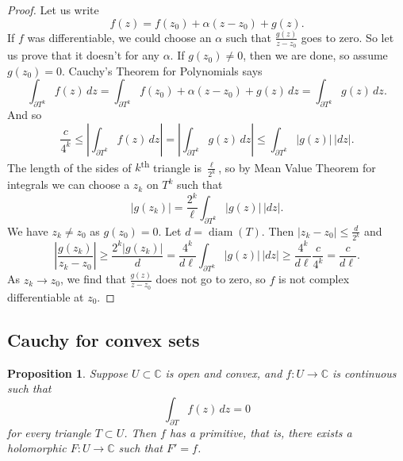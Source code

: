 \documentclass[12pt,openany]{book}
\newcommand{\sabs}[1]{\lvert {#1} \rvert}
\newcommand{\abs}[1]{\left\lvert {#1} \right\rvert}
\newcommand{\C}{{\mathbb{C}}}
\theoremstyle{plain}
\newtheorem{prop}[thm]{Proposition}
\theoremstyle{remark}
\theoremstyle{definition}
\theoremstyle{exercise}
\theoremstyle{example}
\begin{document}
\begin{proof}
Let us write
\begin{equation*}
f(z) = f(z_0) + \alpha (z-z_0) + g(z) .
\end{equation*}
If $f$ was differentiable, we could choose an $\alpha$ such that
$\frac{g(z)}{z-z_0}$ goes to zero.
So let us prove that it doesn't for any $\alpha$.  If $g(z_0) \not= 0$,
then we are done, so assume $g(z_0) = 0$.
Cauchy's Theorem for Polynomials says
\begin{equation*}
\int_{\partial T^k} f(z) \, dz =
\int_{\partial T^k} f(z_0) + \alpha (z-z_0) + g(z) \, dz =
\int_{\partial T^k} g(z) \, dz .
\end{equation*}
And so
\begin{equation*}
\frac{c}{4^k} \leq
\abs{
\int_{\partial T^k} f(z) \, dz
} =
\abs{
\int_{\partial T^k} g(z) \, dz 
}
\leq
\int_{\partial T^k} \sabs{g(z)} \, \sabs{dz} .
\end{equation*}
The length of the sides of $k$\textsuperscript{th} triangle is
$\frac{\ell}{2^k}$, so
by Mean Value Theorem for integrals we can choose a $z_k$ on $T^k$ such that
\begin{equation*}
\sabs{g(z_k)} = 
\frac{2^k}{\ell}
\int_{\partial T^k} \sabs{g(z)} \, \sabs{dz} .
\end{equation*}
We have $z_k \not= z_0$ as $g(z_0)=0$.
Let $d = \operatorname{diam}(T)$.  Then
$\sabs{z_k-z_0} \leq \frac{d}{2^k}$ and
\begin{equation*}
\abs{\frac{g(z_k)}{z_k-z_0}}
\geq
\frac{2^k\sabs{g(z_k)}}{d}
=
\frac{4^k}{d \ell}
\int_{\partial T^k} \sabs{g(z)} \, \sabs{dz}
\geq
\frac{4^k}{d \ell}
\frac{c}{4^k} = \frac{c}{d \ell} .
\end{equation*}
As $z_k \to z_0$, we find that $\frac{g(z)}{z-z_0}$ does not 
go to zero, so $f$ is not complex differentiable at $z_0$.
\end{proof}

\subsection{Cauchy for convex sets}

\begin{prop} \label{prop:primitiveinconvex1}
Suppose $U \subset \C$ is open and convex,
and $f \colon U \to \C$ is continuous such that
\begin{equation*}
\int_{\partial T} f(z) \, dz = 0
\end{equation*}
for every triangle $T \subset U$.
Then $f$ has a primitive, that is,
there exists a holomorphic $F \colon U \to \C$
such that $F' = f$.
\end{prop}
\end{document}
